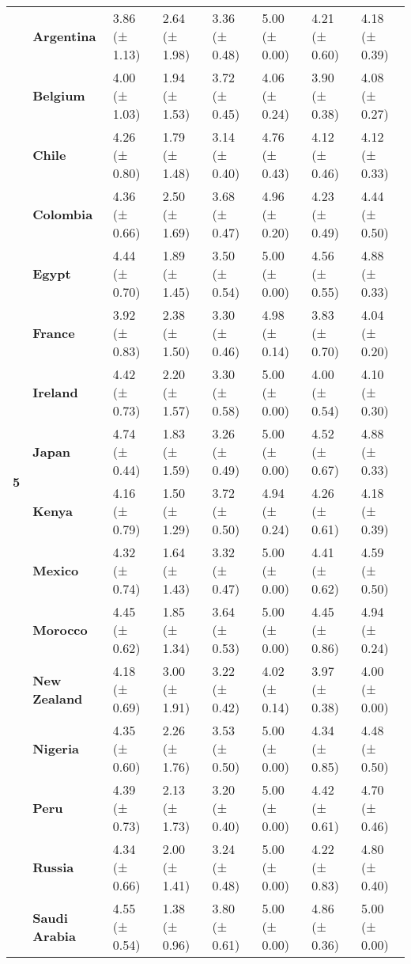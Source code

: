 \begin{longtable}{llllllll}
\cline{1-8}
\multirow[t]{19}{*}{\textbf{5}} & \textbf{Argentina} & 3.86 (± 1.13) & 2.64 (± 1.98) & 3.36 (± 0.48) & 5.00 (± 0.00) & 4.21 (± 0.60) & 4.18 (± 0.39) \\
\textbf{} & \textbf{Belgium} & 4.00 (± 1.03) & 1.94 (± 1.53) & 3.72 (± 0.45) & 4.06 (± 0.24) & 3.90 (± 0.38) & 4.08 (± 0.27) \\
\textbf{} & \textbf{Chile} & 4.26 (± 0.80) & 1.79 (± 1.48) & 3.14 (± 0.40) & 4.76 (± 0.43) & 4.12 (± 0.46) & 4.12 (± 0.33) \\
\textbf{} & \textbf{Colombia} & 4.36 (± 0.66) & 2.50 (± 1.69) & 3.68 (± 0.47) & 4.96 (± 0.20) & 4.23 (± 0.49) & 4.44 (± 0.50) \\
\textbf{} & \textbf{Egypt} & 4.44 (± 0.70) & 1.89 (± 1.45) & 3.50 (± 0.54) & 5.00 (± 0.00) & 4.56 (± 0.55) & 4.88 (± 0.33) \\
\textbf{} & \textbf{France} & 3.92 (± 0.83) & 2.38 (± 1.50) & 3.30 (± 0.46) & 4.98 (± 0.14) & 3.83 (± 0.70) & 4.04 (± 0.20) \\
\textbf{} & \textbf{Ireland} & 4.42 (± 0.73) & 2.20 (± 1.57) & 3.30 (± 0.58) & 5.00 (± 0.00) & 4.00 (± 0.54) & 4.10 (± 0.30) \\
\textbf{} & \textbf{Japan} & 4.74 (± 0.44) & 1.83 (± 1.59) & 3.26 (± 0.49) & 5.00 (± 0.00) & 4.52 (± 0.67) & 4.88 (± 0.33) \\
\textbf{} & \textbf{Kenya} & 4.16 (± 0.79) & 1.50 (± 1.29) & 3.72 (± 0.50) & 4.94 (± 0.24) & 4.26 (± 0.61) & 4.18 (± 0.39) \\
\textbf{} & \textbf{Mexico} & 4.32 (± 0.74) & 1.64 (± 1.43) & 3.32 (± 0.47) & 5.00 (± 0.00) & 4.41 (± 0.62) & 4.59 (± 0.50) \\
\textbf{} & \textbf{Morocco} & 4.45 (± 0.62) & 1.85 (± 1.34) & 3.64 (± 0.53) & 5.00 (± 0.00) & 4.45 (± 0.86) & 4.94 (± 0.24) \\
\textbf{} & \textbf{New Zealand} & 4.18 (± 0.69) & 3.00 (± 1.91) & 3.22 (± 0.42) & 4.02 (± 0.14) & 3.97 (± 0.38) & 4.00 (± 0.00) \\
\textbf{} & \textbf{Nigeria} & 4.35 (± 0.60) & 2.26 (± 1.76) & 3.53 (± 0.50) & 5.00 (± 0.00) & 4.34 (± 0.85) & 4.48 (± 0.50) \\
\textbf{} & \textbf{Peru} & 4.39 (± 0.73) & 2.13 (± 1.73) & 3.20 (± 0.40) & 5.00 (± 0.00) & 4.42 (± 0.61) & 4.70 (± 0.46) \\
\textbf{} & \textbf{Russia} & 4.34 (± 0.66) & 2.00 (± 1.41) & 3.24 (± 0.48) & 5.00 (± 0.00) & 4.22 (± 0.83) & 4.80 (± 0.40) \\
\textbf{} & \textbf{Saudi Arabia} & 4.55 (± 0.54) & 1.38 (± 0.96) & 3.80 (± 0.61) & 5.00 (± 0.00) & 4.86 (± 0.36) & 5.00 (± 0.00) \\

\end{longtable}
